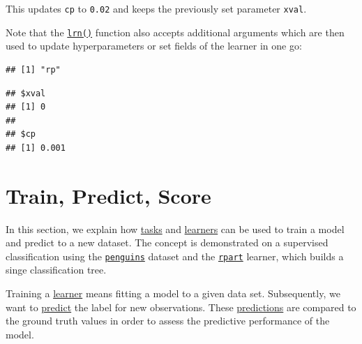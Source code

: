 \documentclass[
]{scrbook}
\newenvironment{Shaded}{\begin{snugshade}}{\end{snugshade}}
\newcommand{\AttributeTok}[1]{\textcolor[rgb]{0.77,0.63,0.00}{#1}}
\newcommand{\FloatTok}[1]{\textcolor[rgb]{0.00,0.00,0.81}{#1}}
\newcommand{\FunctionTok}[1]{\textcolor[rgb]{0.00,0.00,0.00}{#1}}
\newcommand{\NormalTok}[1]{#1}
\newcommand{\OtherTok}[1]{\textcolor[rgb]{0.56,0.35,0.01}{#1}}
\newcommand{\SpecialCharTok}[1]{\textcolor[rgb]{0.00,0.00,0.00}{#1}}
\newcommand{\StringTok}[1]{\textcolor[rgb]{0.31,0.60,0.02}{#1}}
\renewenvironment{Shaded} {\begin{snugshade}\small} {\end{snugshade}}
\begin{document}
This updates \texttt{cp} to \texttt{0.02} and keeps the previously set parameter \texttt{xval}.

Note that the \href{https://mlr3.mlr-org.com/reference/mlr_sugar.html}{\texttt{lrn()}} function also accepts additional arguments which are then used to update hyperparameters or set fields of the learner in one go:

\begin{Shaded}
\end{Shaded}

\begin{verbatim}
## [1] "rp"
\end{verbatim}

\begin{Shaded}
\end{Shaded}

\begin{verbatim}
## $xval
## [1] 0
## 
## $cp
## [1] 0.001
\end{verbatim}

\hypertarget{train-predict}{%
\section{Train, Predict, Score}\label{train-predict}}

In this section, we explain how \protect\hyperlink{tasks}{tasks} and \protect\hyperlink{learners}{learners} can be used to train a model and predict to a new dataset.
The concept is demonstrated on a supervised classification using the \href{https://mlr3.mlr-org.com/reference/mlr_tasks_penguins.html}{\texttt{penguins}} dataset and the \href{https://mlr3.mlr-org.com/reference/mlr_learners_classif.rpart.html}{\texttt{rpart}} learner, which builds a singe classification tree.

Training a \protect\hyperlink{learners}{learner} means fitting a model to a given data set.
Subsequently, we want to \protect\hyperlink{predicting}{predict} the label for new observations.
These \protect\hyperlink{predicting}{predictions} are compared to the ground truth values in order to assess the predictive performance of the model.
\end{document}
